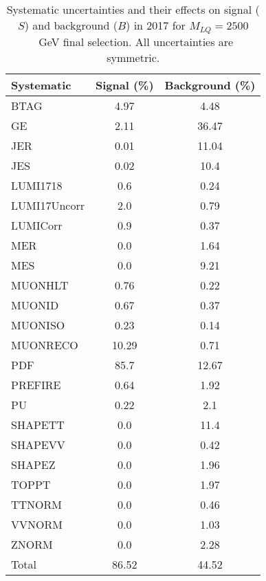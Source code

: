 \begin{table}[htbp]
\begin{center}
\caption{Systematic uncertainties and their effects on signal ($S$) and background ($B$) in 2017 for $M_{LQ}=2500$~GeV final selection. All uncertainties are symmetric.}
\begin{tabular}{lcc}
\hline\hline
Systematic & Signal (\%) & Background (\%) \\ \hline 
BTAG & 4.97 & 4.48\\ 
GE & 2.11 & 36.47\\ 
JER & 0.01 & 11.04\\ 
JES & 0.02 & 10.4\\ 
LUMI1718 & 0.6 & 0.24\\ 
LUMI17Uncorr & 2.0 & 0.79\\ 
LUMICorr & 0.9 & 0.37\\ 
MER & 0.0 & 1.64\\ 
MES & 0.0 & 9.21\\ 
MUONHLT & 0.76 & 0.22\\ 
MUONID & 0.67 & 0.37\\ 
MUONISO & 0.23 & 0.14\\ 
MUONRECO & 10.29 & 0.71\\ 
PDF & 85.7 & 12.67\\ 
PREFIRE & 0.64 & 1.92\\ 
PU & 0.22 & 2.1\\ 
SHAPETT & 0.0 & 11.4\\ 
SHAPEVV & 0.0 & 0.42\\ 
SHAPEZ & 0.0 & 1.96\\ 
TOPPT & 0.0 & 1.97\\ 
TTNORM & 0.0 & 0.46\\ 
VVNORM & 0.0 & 1.03\\ 
ZNORM & 0.0 & 2.28\\ 
Total & 86.52 & 44.52\\ \hline \hline
\end{tabular}
\label{tab:SysUncertainties_uujj_2500}
\end{center}
\end{table}

